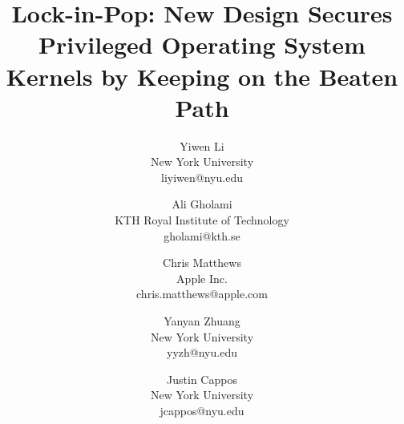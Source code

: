 \documentclass[letterpaper,twocolumn,10pt]{article}
\begin{document}




\title{\Large \bf{Lock-in-Pop: New Design Secures Privileged Operating System Kernels by Keeping on the Beaten Path}}


\author{
{\rm Yiwen Li}\\
New York University \\
liyiwen@nyu.edu
\and
{\rm Ali Gholami}\\
KTH Royal Institute of Technology\\
gholami@kth.se
\and
{\rm Chris Matthews}\\
Apple Inc. \\
chris.matthews@apple.com
\and
{\rm Yanyan Zhuang}\\
New York University \\
yyzh@nyu.edu
\and
{\rm Justin Cappos}\\
New York University \\
jcappos@nyu.edu
} %


\maketitle


\thispagestyle{empty}



















{
\footnotesize


}



\end{document}
